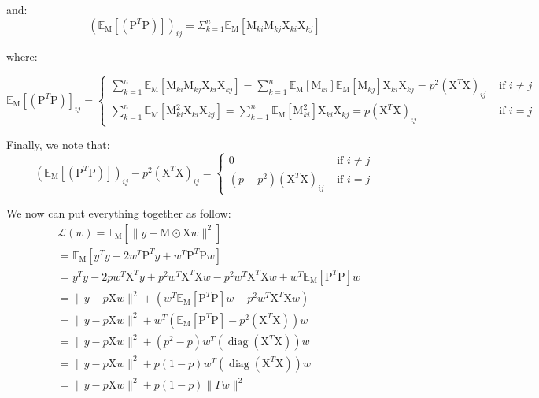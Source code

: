 \documentclass{homework}
\begin{document}
and:
$$
\left(\mathbb{E}_{\mathrm{M}}\left[\left(\mathrm{P}^{T} \mathrm{P}\right)\right]\right)_{i j}=\Sigma_{k=1}^{n} \mathbb{E}_{\mathrm{M}}\left[\mathrm{M}_{k i} \mathrm{M}_{k j} \mathrm{X}_{k i} \mathrm{X}_{k j}\right]
$$

where:

$\mathbb{E}_{\mathrm{M}}\left[\left(\mathrm{P}^{T} \mathrm{P}\right)\right]_{i j}= \begin{cases}\sum_{k=1}^{n} \mathbb{E}_{\mathrm{M}}\left[\mathrm{M}_{k i} \mathrm{M}_{k j} \mathrm{X}_{k i} \mathrm{X}_{k j}\right]=\sum_{k=1}^{n} \mathbb{E}_{\mathrm{M}}\left[\mathrm{M}_{k i}\right] \mathbb{E}_{\mathrm{M}}\left[\mathrm{M}_{k j}\right] \mathrm{X}_{k i} \mathrm{X}_{k j}=p^{2}\left(\mathrm{X}^{T} \mathrm{X}\right)_{i j} & \text { if } i \neq j \\ \sum_{k=1}^{n} \mathbb{E}_{\mathrm{M}}\left[\mathrm{M}_{k i}^{2} \mathrm{X}_{k i} \mathrm{X}_{k j}\right]=\sum_{k=1}^{n} \mathbb{E}_{\mathrm{M}}\left[\mathrm{M}_{k i}^{2}\right] \mathrm{X}_{k i} \mathrm{X}_{k j}=p\left(\mathrm{X}^{T} \mathrm{X}\right)_{i j} & \text { if } i=j\end{cases}$

Finally, we note that:
$$
\left(\mathbb{E}_{\mathrm{M}}\left[\left(\mathrm{P}^{T} \mathrm{P}\right)\right]\right)_{i j}-p^{2}\left(\mathrm{X}^{T} \mathrm{X}\right)_{i j}= \begin{cases}0 & \text { if } i \neq j \\ \left(p-p^{2}\right)\left(\mathrm{X}^{T} \mathrm{X}\right)_{i j} & \text { if } i=j\end{cases}
$$

We now can put everything together as follow:
$$
\begin{aligned}
& \mathcal{L}(w)=\mathbb{E}_{\mathrm{M}}\left[\|y-\mathrm{M} \odot \mathrm{X} w\|^{2}\right] \\
& =\mathbb{E}_{\mathrm{M}}\left[y^{T} y-2 w^{T} \mathrm{P}^{T} y+w^{T} \mathrm{P}^{T} \mathrm{P} w\right] \\
& =y^{T} y-2 p w^{T} \mathrm{X}^{T} y+p^{2} w^{T} \mathrm{X}^{T} \mathrm{X} w-p^{2} w^{T} \mathrm{X}^{T} \mathrm{X} w+w^{T} \mathbb{E}_{\mathrm{M}}\left[\mathrm{P}^{T} \mathrm{P}\right] w \\
& =\|y-p \mathrm{X} w\|^{2}+\left(w^{T} \mathbb{E}_{\mathrm{M}}\left[\mathrm{P}^{T} \mathrm{P}\right] w-p^{2} w^{T} \mathrm{X}^{T} \mathrm{X} w\right) \\
& =\|y-p \mathrm{X} w\|^{2}+w^{T}\left(\mathbb{E}_{\mathrm{M}}\left[\mathrm{P}^{T} \mathrm{P}\right] -p^{2}\left(\mathrm{X}^{T} \mathrm{X}\right)\right) w \\
& =\|y-p \mathrm{X} w\|^{2}+\left(p^{2}-p\right) w^{T}\left(\operatorname{diag}\left(\mathrm{X}^{T} \mathrm{X}\right)\right) w \\
& =\|y-p \mathrm{X} w\|^{2}+p(1-p) w^{T}\left(\operatorname{diag}\left(\mathrm{X}^{T} \mathrm{X}\right)\right) w \\
& =\|y-p \mathrm{X} w\|^{2}+p(1-p)\|\Gamma w\|^{2}
\end{aligned}
$$
\end{document}
